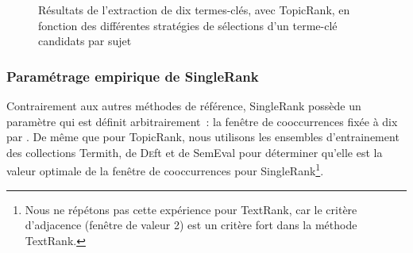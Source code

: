 \begin{figure}
          \caption{Résultats de l'extraction de dix termes-clés, avec TopicRank,
                   en fonction des différentes stratégies de sélections d'un
                   terme-clé candidats par sujet
                   \label{fig:variation_de_la_selection_des_candidats}}
        \end{figure}

      \subsubsection{Paramétrage empirique de SingleRank}
      \label{subsubsec:main:domain_independent_keyphrase_extraction-unsupervised_automatic_keyphrase_extraction-evaluation-empirical_setting_of_singlerank}
        Contrairement aux autres méthodes de référence, SingleRank possède un
        paramètre qui est définit arbitrairement~: la fenêtre de cooccurrences
        fixée à dix par . De même que pour TopicRank,
        nous utilisons les ensembles d'entrainement des collections Termith, de
        \textsc{De}ft et de SemEval pour déterminer qu'elle est la valeur
        optimale de la fenêtre de cooccurrences pour SingleRank\footnote{Nous ne
        répétons pas cette expérience pour TextRank, car le critère d'adjacence
        (fenêtre de valeur 2) est un critère fort dans la méthode TextRank.}. 

